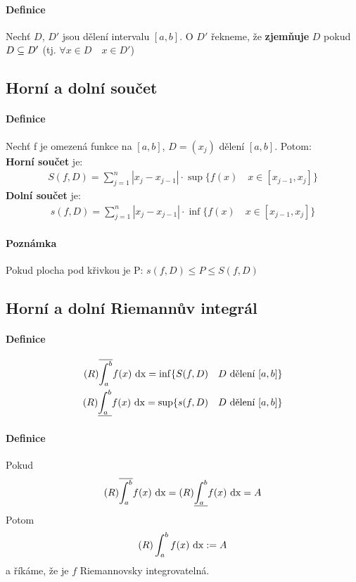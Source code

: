 \documentclass[a4paper,10pt]{article}
\begin{document}
\paragraph{Definice}
Nechť $D$, $D'$ jsou dělení intervalu $[a,b]$. O $D'$ řekneme, že
\textbf{zjemňuje} $D$ pokud $D\subseteq D'$ (tj. $\forall x \in D \quad  x \in D'$)


\subsection{Horní a dolní součet}
\setcounter{equation}{0}
\paragraph{Definice}
Nechť f je omezená funkce na $[a,b]$, $D=(x_j)$ dělení $[a,b]$. Potom: \\
\textbf{Horní součet} je:
\begin{align*}
	S(f, D) = \sum_{j=1}^n |x_j - x_{j-1}| \cdot \sup \{f(x) \quad 
	x \in [x_{j-1},	x_j]\}
\end{align*}
\textbf{Dolní součet} je:
\begin{align*}
	s(f, D) = \sum_{j=1}^n |x_j - x_{j-1}| \cdot \inf \{f(x) \quad 
	x \in [x_{j-1},	x_j]\}
\end{align*}


\paragraph{Poznámka}Pokud plocha pod křivkou je P: $s(f,D) \le P \le S(f,D)$

\subsection{Horní a dolní Riemannův integrál}
\setcounter{equation}{0}
\paragraph{Definice}
\begin{align*}
	(R) \overline{\int_a^b} f(x) \operatorname*{\,dx} = \inf \{ S(f, D) \quad D \text{ dělení }
	[a,b]\} \\
	(R) \underline{\int_a^b} f(x) \operatorname*{\,dx} = \sup \{ s(f, D) \quad D \text{ dělení }
	[a,b]\}
\end{align*}

\paragraph{Definice}
Pokud 
\begin{align*}
(R) \overline{\int_a^b} f(x) \operatorname*{\,dx} = (R) \underline{\int_a^b} f(x) \operatorname*{\,dx} = A
\end{align*}
Potom
\begin{align*}
(R) \int_a^b f(x) \operatorname*{\,dx} := A
\end{align*}
a říkáme, že je $f$ Riemannovsky integrovatelná.
\end{document}
